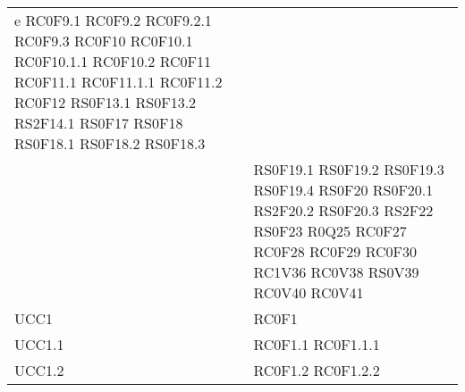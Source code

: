 \begin{center}
\begin{longtable}{|p{5cm}|p{5cm}|}
e RC0F9.1 \newline RC0F9.2 \newline RC0F9.2.1 \newline RC0F9.3 \newline RC0F10 \newline RC0F10.1 \newline RC0F10.1.1 \newline RC0F10.2 \newline RC0F11 \newline RC0F11.1 \newline RC0F11.1.1 \newline RC0F11.2 \newline RC0F12 \newline RS0F13.1 \newline RS0F13.2 \newline RS2F14.1 \newline RS0F17 \newline RS0F18 \newline RS0F18.1 \newline RS0F18.2 \newline RS0F18.3 \\ & RS0F19.1 \newline RS0F19.2 \newline RS0F19.3 \newline RS0F19.4 \newline RS0F20 \newline RS0F20.1 \newline RS2F20.2 \newline RS0F20.3 \newline RS2F22 \newline RS0F23 \newline R0Q25 \newline RC0F27 \newline RC0F28 \newline RC0F29 \newline RC0F30 \newline RC1V36 \newline RC0V38 \newline RS0V39 \newline RC0V40 \newline RC0V41 \\\hline
UCC1 		& RC0F1 \\\hline
UCC1.1		& RC0F1.1 \newline RC0F1.1.1 \\\hline
UCC1.2		& RC0F1.2 \newline RC0F1.2.2 \\\hline

\end{longtable}
\end{center}
